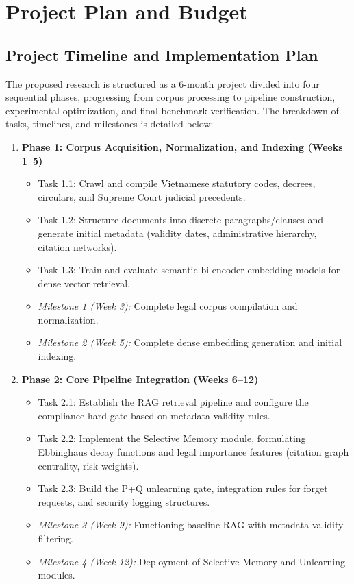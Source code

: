 \section{Project Plan and Budget}

\subsection{Project Timeline and Implementation Plan}
The proposed research is structured as a 6-month project divided into four sequential phases, progressing from corpus processing to pipeline construction, experimental optimization, and final benchmark verification. The breakdown of tasks, timelines, and milestones is detailed below:

\begin{enumerate}
    \item \textbf{Phase 1: Corpus Acquisition, Normalization, and Indexing (Weeks 1--5)}
    \begin{itemize}
        \item Task 1.1: Crawl and compile Vietnamese statutory codes, decrees, circulars, and Supreme Court judicial precedents.
        \item Task 1.2: Structure documents into discrete paragraphs/clauses and generate initial metadata (validity dates, administrative hierarchy, citation networks).
        \item Task 1.3: Train and evaluate semantic bi-encoder embedding models for dense vector retrieval.
        \item \textit{Milestone 1 (Week 3):} Complete legal corpus compilation and normalization.
        \item \textit{Milestone 2 (Week 5):} Complete dense embedding generation and initial indexing.
    \end{itemize}

    \item \textbf{Phase 2: Core Pipeline Integration (Weeks 6--12)}
    \begin{itemize}
        \item Task 2.1: Establish the RAG retrieval pipeline and configure the compliance hard-gate based on metadata validity rules.
        \item Task 2.2: Implement the Selective Memory module, formulating Ebbinghaus decay functions and legal importance features (citation graph centrality, risk weights).
        \item Task 2.3: Build the P+Q unlearning gate, integration rules for forget requests, and security logging structures.
        \item \textit{Milestone 3 (Week 9):} Functioning baseline RAG with metadata validity filtering.
        \item \textit{Milestone 4 (Week 12):} Deployment of Selective Memory and Unlearning modules.
    \end{itemize}


\end{enumerate}

